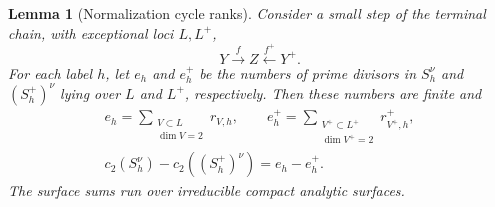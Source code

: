 \documentclass[11pt]{amsart}
\newtheorem{lemma}[theorem]{Lemma}
\theoremstyle{definition}
\theoremstyle{remark}
\numberwithin{equation}{section}
\begin{document}
\begin{lemma}[Normalization cycle ranks]\label{lem:difficulty-ranks}
Consider a small step of the terminal chain, with exceptional loci
\(L,L^+\),
\[
 Y\xrightarrow{f}Z\xleftarrow{f^+}Y^+.
\]
For each label \(h\), let \(e_h\) and \(e_h^+\) be the numbers of prime
divisors in \(S_h^\nu\) and \((S_h^+)^\nu\) lying over \(L\) and
\(L^+\), respectively.  Then these numbers are finite and
\begin{equation}\label{eq:difficulty-rank-change}
 \begin{gathered}
 e_h=\sum_{\substack{V\subset L\\\dim V=2}}r_{V,h},\qquad
 e_h^+=\sum_{\substack{V^+\subset L^+\\\dim V^+=2}}r_{V^+,h}^+,\\
 c_2(S_h^\nu)-c_2((S_h^+)^\nu)=e_h-e_h^+.
 \end{gathered}
\end{equation}
The surface sums run over irreducible compact analytic surfaces.
\end{lemma}
\end{document}
